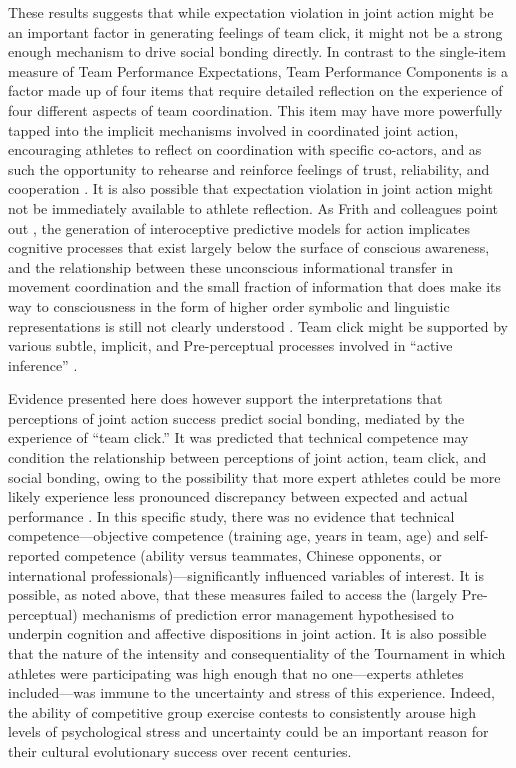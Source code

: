 \begin{CJK}{UTF8}{gbsn}
  These results suggests that while expectation violation in joint action might be an important factor in generating feelings of team click, it might not be a strong enough mechanism to drive social bonding directly.  In contrast to the single-item measure of Team Performance Expectations, Team Performance Components is a factor made up of four items that require detailed reflection on the experience of four different aspects of team coordination.  This item may have more powerfully tapped into the implicit mechanisms involved in coordinated joint action, encouraging athletes to reflect on coordination with specific co-actors, and as such the opportunity to rehearse and reinforce feelings of trust, reliability, and cooperation \citep{Reddish2013a}.  It is also possible that expectation violation in joint action might not be immediately available to athlete reflection.
  As Frith and colleagues point out \textcite{Frith2007,Frith2010,Clark2013}, the generation of interoceptive predictive models for action implicates cognitive processes that exist largely below the surface of conscious awareness, and the relationship between these unconscious informational transfer in movement coordination and the small fraction of information that does make its way to consciousness in the form of higher order symbolic and linguistic representations is still not clearly understood \citep{Semin2008}. Team click might be supported by various subtle, implicit, and Pre-perceptual processes involved in ``active inference'' \citep{Schmidt2011}.

  Evidence presented here does however support the interpretations that perceptions of joint action success predict social bonding, mediated by the experience of ``team click.'' It was predicted that technical competence may condition the relationship between perceptions of joint action, team click, and social bonding, owing to the possibility that more expert athletes could be more likely experience less pronounced discrepancy between expected and actual performance \cite{Tomeo2012}.  In this specific study, there was no evidence that technical competence---objective competence (training age, years in team, age) and self-reported competence (ability versus teammates, Chinese opponents, or international professionals)---significantly influenced variables of interest.  It is possible, as noted above, that these measures failed to access the (largely Pre-perceptual) mechanisms of prediction error management hypothesised to underpin cognition and affective dispositions in joint action.  It is also possible that the nature of the intensity and consequentiality of the Tournament in which athletes were participating was high enough that no one---experts athletes included---was immune to the uncertainty and stress of this experience. Indeed, the ability of competitive group exercise contests to consistently arouse high levels of psychological stress and uncertainty could be an important reason for their cultural evolutionary success over recent centuries.


\end{CJK}
